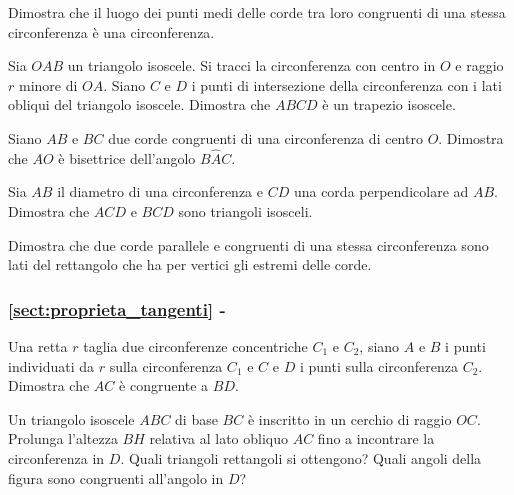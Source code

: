 \begin{multicols}{2}

\begin{esercizio}
\label{ese:5.6}
Dimostra che il luogo dei punti medi delle corde tra loro congruenti 
di una stessa circonferenza è una circonferenza.
\end{esercizio}

\begin{esercizio}
\label{ese:5.8}
Sia $OAB$ un triangolo isoscele. Si tracci la circonferenza con 
centro in $O$ e raggio $r$ minore di $OA$. Siano $C$ e $D$ i punti di 
intersezione della circonferenza con i lati obliqui del triangolo 
isoscele. Dimostra che $ABCD$ è un trapezio isoscele.
\end{esercizio}

\begin{esercizio}
\label{ese:5.9}
Siano $AB$ e $BC$ due corde congruenti di una circonferenza di centro 
$O$. Dimostra che $AO$ è bisettrice dell'angolo $B\widehat{A}C$.
\end{esercizio}


\begin{esercizio}
\label{ese:5.18}
Sia $AB$ il diametro di una circonferenza e $CD$ una corda 
perpendicolare ad $AB$. Dimostra che $ACD$ e $BCD$ sono triangoli 
isosceli.
\end{esercizio}

\begin{esercizio}
\label{ese:5.19}
Dimostra che due corde parallele e congruenti di una stessa 
circonferenza sono lati del rettangolo che ha per vertici gli estremi 
delle corde.
\end{esercizio}

\begingroup
\hypersetup{linkcolor=black}
\subsubsection*{\ref{sect:proprieta_tangenti} - 
}
\endgroup


\begin{esercizio}
\label{ese:5.22}
Una retta $r$ taglia due circonferenze concentriche $C_1$ e $C_2$, 
siano $A$ e $B$ i punti individuati da $r$ sulla circonferenza $C_1$ 
e $C$ e $D$ i punti sulla circonferenza $C_2$. Dimostra che $AC$ è 
congruente a $BD$.
\end{esercizio}

\begin{esercizio}
\label{ese:5.23}
Un triangolo isoscele $ABC$ di base $BC$ è inscritto in un cerchio di 
raggio $OC$. Prolunga l'altezza $BH$ relativa al lato obliquo $AC$ 
fino a incontrare la circonferenza in $D$. Quali triangoli rettangoli 
si ottengono? Quali angoli della figura sono congruenti all'angolo in 
$D$?
\end{esercizio}


\end{multicols}
